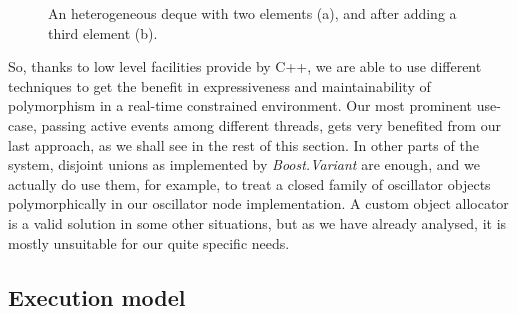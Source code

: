 \begin{figure}[h!]
  \centering


  \caption{An heterogeneous deque with two elements (a), and after
    adding a third element (b).}
  \label{fig:heterostructure}
\end{figure}

So, thanks to low level facilities provide by C++, we are able to use
different techniques to get the benefit in expressiveness and
maintainability of polymorphism in a real-time constrained
environment. Our most prominent use-case, passing active events among
different threads, gets very benefited from our last approach, as we
shall see in the rest of this section. In other parts of the system,
disjoint unions as implemented by
\emph{Boost.Variant} are enough, and we actually do use them, for
example, to treat a closed family of oscillator objects
polymorphically in our oscillator node implementation. A custom object
allocator is a valid solution in some other situations, but as we have
already analysed, it is mostly unsuitable for our quite specific
needs.

\subsection{Execution model}

